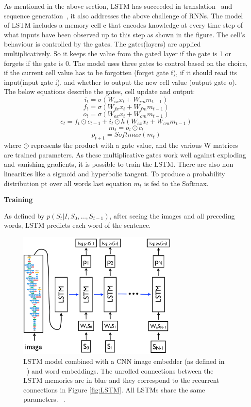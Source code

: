 \documentclass[a4paper,UKenglish,cleveref, autoref, thm-restate]{lipics-v2021}
\begin{document}
As mentioned in the above section, LSTM has succeeded in translation~\cite{3} and sequence generation~\cite{9}, it also addresses the above challenge of RNNs.
The model of LSTM includes a memory cell c that encodes knowledge at every time step of what inputs have been observed up to this step as shown in the figure. The cell's behaviour is controlled by the gates.
The gates(layers) are applied multiplicatively. So it keeps the value from the gated layer if the gate is 1 or forgets if the gate is 0.
The model uses three gates to control based on the choice, if the current cell value has to be forgotten (forget gate f), if it should read its input(input gate i), and whether to output the new cell value (output gate o).
The below equations describe the gates, cell update and output:
\[ i_{t} = \sigma (W_{ix}x_{t} + W_{im}m_{t-1})  \label{eq:equation4} \tag{4} \]
\[ f_{t} = \sigma (W_{fx}x_{t} + W_{fm}m_{t-1})  \label{eq:equation5} \tag{5} \]
\[ o_{t} = \sigma (W_{ox}x_{t} + W_{om}m_{t-1})   \label{eq:equation6} \tag{6} \]
\[ c_{t} = f_{t} \odot c_{t-1} + i_{t} \odot h(W_{cx}x_{t} + W_{cm}m_{t-1}) \label{eq:equation7} \tag{7} \]
\[m_{t} = o_{t} \odot c_{t} \label{eq:equation8} \tag{8}\]
\[p_{t+1} = Softmax(m_t)  \label{eq:equation9} \tag{9} \]
where $ \odot$ represents the product with a gate value, and the various W matrices are trained parameters.
As these multiplicative gates work well against exploding and vanishing gradients, it is possible to train the LSTM.
There are also non-linearities like a sigmoid and hyperbolic tangent.
To produce a probability distribution pt over all words last equation $m_{t}$ is fed  to the Softmax.

\textbf{Training}

As defined by $p(S_{t}|I, S_{0},..., S_{t-1})$, after seeing the images and all preceding words, LSTM predicts each word of the sentence.
\begin{figure}[ht]
    \centering
    \includegraphics[width=8cm]{images/lstm.png}
    \caption{ LSTM model combined with a CNN image embedder
(as defined in ~\cite{12}) and word embeddings. The unrolled connections between the LSTM memories are in blue and they correspond to the recurrent connections in Figure \ref{fig:LSTM}. All LSTMs share
the same parameters. ~\cite{NIC}.}
    \label{fig:LSTM+CNN}
\end{figure}
\end{document}
